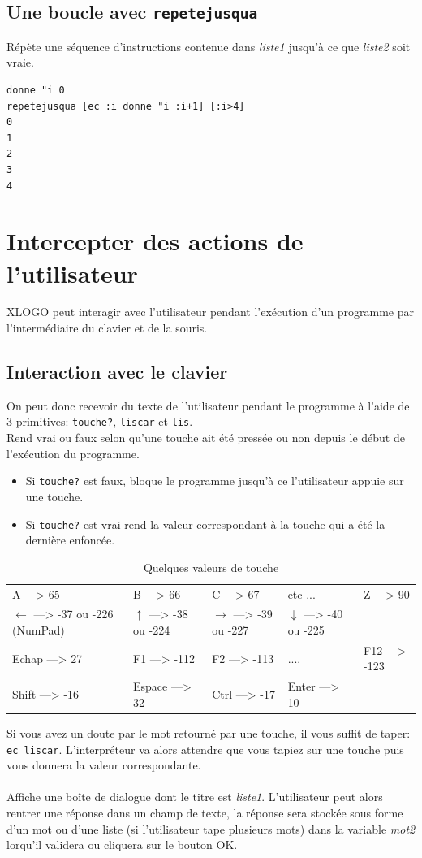 \subsection{Une boucle avec \texttt{repetejusqua}}
\noindent {}
Répète une séquence d'instructions contenue dans \textit{liste1} jusqu'à ce que \textit{liste2} soit vraie.
\begin{verbatim}
donne "i 0
repetejusqua [ec :i donne "i :i+1] [:i>4]
0
1
2
3
4
\end{verbatim}

\section{Intercepter des actions de l'utilisateur}
XLOGO peut interagir avec l'utilisateur pendant l'exécution d'un programme par l'intermédiaire du clavier et de la souris. 
\subsection{Interaction avec le clavier}
On peut donc recevoir du texte de l'utilisateur pendant le programme à l'aide de 3 primitives: \texttt{touche?}, \texttt{liscar} et \texttt{lis}.\\
Rend vrai ou faux selon qu'une touche ait été pressée ou non depuis le début de l'exécution du programme.\\
\begin{itemize}
\item Si \texttt{touche?} est faux, bloque le programme jusqu'à ce l'utilisateur appuie sur une touche.
\item Si \texttt{touche?} est vrai rend la valeur correspondant à la touche qui a été la dernière enfoncée.
\end{itemize}
\begin{table}[h]
\begin{tabular}{|lllll|}
\hline
A ---> 65 & B ---> 66 & C ---> 67 & etc ... & Z ---> 90\\
$\leftarrow$ ---> -37 ou -226 (NumPad) & $\uparrow$ ---> -38 ou -224  & $\rightarrow$ ---> -39 ou -227  & $\downarrow$ ---> -40 ou -225 &\\
Echap ---> 27 & F1 ---> -112 & F2 ---> -113 & .... & F12 ---> -123\\
Shift ---> -16 & Espace ---> 32 & Ctrl ---> -17 & Enter ---> 10 &\\
\hline
\end{tabular}
\caption{Quelques valeurs de touche}
\end{table}
Si vous avez un doute par le mot retourné par une touche, il vous suffit de taper:\\
\texttt{ec liscar}. L'interpréteur va alors attendre que vous tapiez sur une touche puis vous donnera la valeur correspondante.\\
\\
 Affiche une boîte de dialogue dont le titre est \textit{liste1}. L'utilisateur peut alors rentrer une réponse dans un champ de texte, la réponse sera stockée sous forme d'un mot ou d'une liste (si l'utilisateur tape plusieurs mots) dans la variable \textit{mot2} lorqu'il validera ou cliquera sur le bouton OK.
